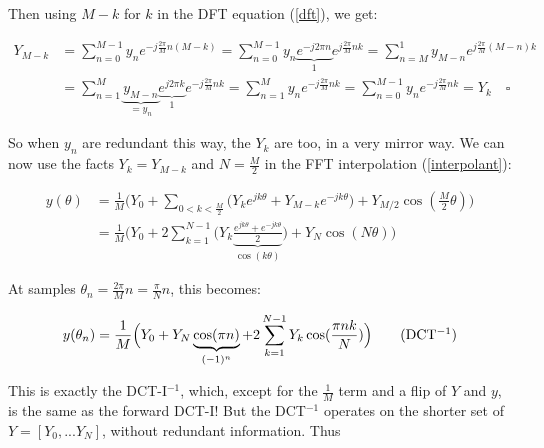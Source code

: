 \documentclass[10pt]{article}
\begin{document}
Then using $M-k$ for $k$ in the DFT equation (\autoref{dft}), we get:

\begin{align*}
Y_{M-k} &= \sum_{n=0}^{M-1} y_n e^{-j \frac{2\pi}{M}n(M-k)} = \sum_{n=0}^{M-1} y_n \underbrace{e^{-j 2\pi n}}_{1} e^{j \frac{2\pi}{M}nk} = \sum_{n = M}^{1} y_{M-n} e^{j \frac{2\pi}{M}(M - n)k} \\
&= \sum_{n=1}^{M} \underbrace{y_{M-n}}_{= y_n} \underbrace{e^{j 2\pi k}}_{1} e^{-j\frac{2\pi}{M}nk} = \sum_{n=1}^M y_n e^{-j \frac{2\pi}{M}nk} = \sum_{n=0}^{M-1} y_n e^{-j \frac{2\pi}{M}nk} = Y_k \quad \square
\end{align*}
\newline

So when $y_n$ are redundant this way, the $Y_k$ are too, in a very mirror way. We can now use the facts $Y_k = Y_{M-k}$ and $N = \frac{M}{2}$ in the FFT interpolation (\autoref{interpolant}):

\begin{equation}\label{reconstruction}
\begin{aligned}
y(\theta) &= \frac{1}{M} \Big(Y_0 + \sum_{0 < k < \frac{M}{2}} \big( Y_k e^{j k \theta} + Y_{M-k} e^{-j k \theta}\big) + Y_{M/2}\cos(\frac{M}{2}\theta) \Big) \\
&= \frac{1}{M} \Big(Y_0 + 2 \sum_{k = 1}^{N-1} \big( Y_k \underbrace{\frac{e^{j k \theta} + e^{-j k \theta}}{2}}_{\cos(k\theta)} \big) + Y_N\cos(N \theta) \Big)
\end{aligned}
\end{equation}

At samples $\theta_n = \frac{2\pi}{M}n = \frac{\pi}{N}n$, this becomes:

\[
y(\theta_n) = \frac{1}{M} \Big(Y_0 + Y_N\underbrace{\cos(\pi n)}_{(-1)^n} + 2 \sum_{k = 1}^{N-1} Y_k \cos(\frac{\pi nk}{N}) \Big) \tag{DCT$^{-1}$}
\]

This is exactly the DCT-I$^{-1}$, which, except for the $\frac{1}{M}$ term and a flip of $Y$ and $y$, is the same as the forward DCT-I! But the DCT$^{-1}$ operates on the shorter set of $Y = [Y_0, ... Y_N]$, without redundant information. Thus
\end{document}

